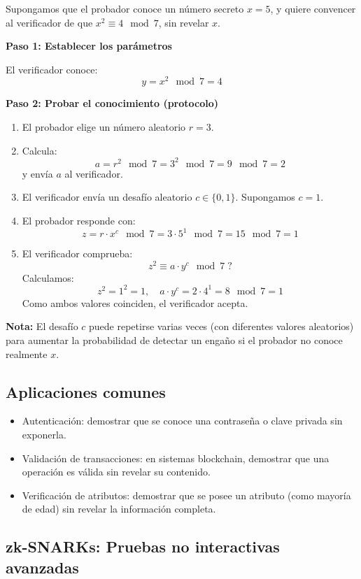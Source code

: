 \documentclass{article}
\begin{document}
Supongamos que el probador conoce un número secreto \( x = 5 \), y quiere convencer al verificador de que \( x^2 \equiv 4 \mod 7 \), sin revelar \( x \).

\textbf{Paso 1: Establecer los parámetros}

El verificador conoce:
\[
y = x^2 \mod 7 = 4
\]

\textbf{Paso 2: Probar el conocimiento (protocolo)}

\begin{enumerate}
    \item El probador elige un número aleatorio \( r = 3 \).
    \item Calcula:
    \[
    a = r^2 \mod 7 = 3^2 \mod 7 = 9 \mod 7 = 2
    \]
    y envía \( a \) al verificador.
    \item El verificador envía un desafío aleatorio \( c \in \{0, 1\} \). Supongamos \( c = 1 \).
    \item El probador responde con:
    \[
    z = r \cdot x^c \mod 7 = 3 \cdot 5^1 \mod 7 = 15 \mod 7 = 1
    \]
    \item El verificador comprueba:
    \[
    z^2 \equiv a \cdot y^c \mod 7 \; ?
    \]
    Calculamos:
    \[
    z^2 = 1^2 = 1, \quad a \cdot y^c = 2 \cdot 4^1 = 8 \mod 7 = 1
    \]
    Como ambos valores coinciden, el verificador acepta.
\end{enumerate}

\textbf{Nota:} El desafío \( c \) puede repetirse varias veces (con diferentes valores aleatorios) para aumentar la probabilidad de detectar un engaño si el probador no conoce realmente \( x \).

\subsection{Aplicaciones comunes}

\begin{itemize}
    \item Autenticación: demostrar que se conoce una contraseña o clave privada sin exponerla.
    \item Validación de transacciones: en sistemas blockchain, demostrar que una operación es válida sin revelar su contenido.
    \item Verificación de atributos: demostrar que se posee un atributo (como mayoría de edad) sin revelar la información completa.
\end{itemize}

\subsection{zk-SNARKs: Pruebas no interactivas avanzadas}
\end{document}
